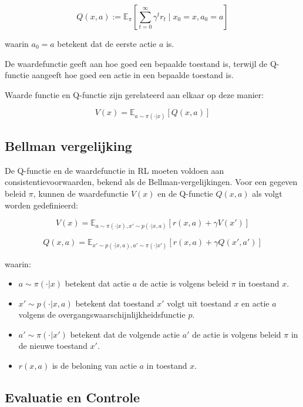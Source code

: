 \documentclass[a4paper,12pt]{report}
\begin{document}
\[
    Q(x,a) := \mathbb{E}_{\pi}\left[\sum_{t=0}^{\infty} \gamma^t r_t \mid x_0 = x, a_0 = a\right]
\]

\noindent waarin \(a_0 = a\) betekent dat de eerste actie \(a\) is.

De waardefunctie geeft aan hoe goed een bepaalde toestand is, terwijl de
Q-functie aangeeft hoe goed een actie in een bepaalde toestand is.

Waarde functie en Q-functie zijn gerelateerd aan elkaar op deze manier:

\[
    V(x) = \mathbb{E}_{a \sim \pi(\cdot|x)}[Q(x,a)]
\]

\subsection*{Bellman vergelijking}

De Q-functie en de waardefunctie in RL moeten voldoen aan
consistentievoorwaarden, bekend als de Bellman-vergelijkingen. Voor een gegeven
beleid \(\pi\), kunnen de waardefunctie \(V(x)\) en de Q-functie \(Q(x,a)\) als
volgt worden gedefinieerd:

\[
    V(x) = \mathbb{E}_{a \sim \pi(\cdot|x), x' \sim p(\cdot|x,a)}[r(x,a) + \gamma V(x')]
\]

\[
    Q(x,a) = \mathbb{E}_{x' \sim p(\cdot|x,a), a' \sim \pi(\cdot|x')}[r(x,a) + \gamma Q(x',a')]
\]

\noindent waarin:
\begin{itemize}
    \item \(a \sim \pi(\cdot|x)\) betekent dat actie \(a\) de actie is volgens beleid \(\pi\) in toestand \(x\).
    \item \(x' \sim p(\cdot|x,a)\) betekent dat toestand \(x'\) volgt uit toestand \(x\) en actie \(a\) volgens de overgangswaarschijnlijkheidsfunctie \(p\).
    \item \(a' \sim \pi(\cdot|x')\) betekent dat de volgende actie \(a'\) de actie is volgens beleid \(\pi\) in de nieuwe toestand \(x'\).
    \item \(r(x,a)\) is de beloning van actie \(a\) in toestand \(x\).
\end{itemize}

\subsection*{Evaluatie en Controle}
\end{document}
